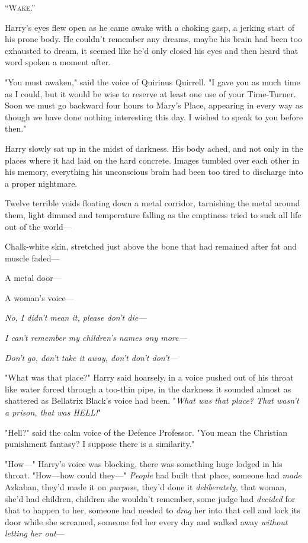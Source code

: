 
\lettrine{“W}{ake}.''

\quad\quad\quad
Harry's eyes flew open as he came awake with a choking gasp, a jerking start of
his prone body. He couldn't remember any dreams, maybe his brain had been too
exhausted to dream, it seemed like he'd only closed his eyes and then heard
that word spoken a moment after.

"You must awaken," said the voice of Quirinus Quirrell. "I gave you as much
time as I could, but it would be wise to reserve at least one use of your
Time-Turner. Soon we must go backward four hours to Mary's Place, appearing in
every way as though we have done nothing interesting this day. I wished to
speak to you before then."

Harry slowly sat up in the midst of darkness. His body ached, and not only in
the places where it had laid on the hard concrete. Images tumbled over each
other in his memory, everything his unconscious brain had been too tired to
discharge into a proper nightmare.

Twelve terrible voids floating down a metal corridor, tarnishing the metal
around them, light dimmed and temperature falling as the emptiness tried to
suck all life out of the world---

Chalk-white skin, stretched just above the bone that had remained after fat and
muscle faded---

A metal door---

A woman's voice---

\emph{No, I didn't mean it, please don't die---}

\emph{I can't remember my children's names any more---}

\emph{Don't go, don't take it away, don't don't don't---}

"What was that place?" Harry said hoarsely, in a voice pushed out of his throat
like water forced through a too-thin pipe, in the darkness it sounded almost as
shattered as Bellatrix Black's voice had been. "\emph{What was that place? That
wasn't a prison, that was HELL!}"

"Hell?" said the calm voice of the Defence Professor. "You mean the Christian
punishment fantasy? I suppose there is a similarity."

"How---" Harry's voice was blocking, there was something huge lodged in his
throat. "How---how could they---" \emph{People} had built that place, someone
had \emph{made} Azkaban, they'd made it on \emph{purpose,} they'd done it
\emph{deliberately,} that woman, she'd had children, children she wouldn't
remember, some judge had \emph{decided} for that to happen to her, someone had
needed to \emph{drag} her into that cell and lock its door while she screamed,
someone fed her every day and walked away \emph{without letting her out}---

